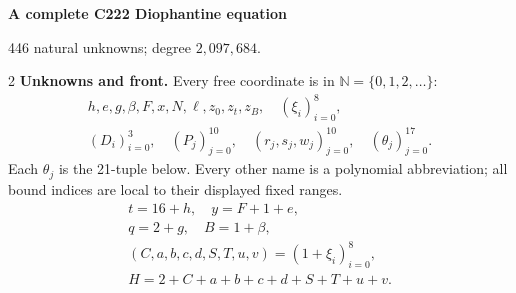 \documentclass[10pt,letterpaper]{article}
\newcommand{\NN}{\mathbb N}
\begin{document}
\fontsize{9}{10.2}\selectfont
\begin{center}
{\fontsize{11}{12}\selectfont\bfseries A complete C222 Diophantine equation}\par
446 natural unknowns; degree $2{,}097{,}684$.
\end{center}
\vspace{-4pt}
\begin{multicols}{2}
\textbf{Unknowns and front.} Every free coordinate is in
$\NN=\{0,1,2,\ldots\}$:
\[
\begin{gathered}
h,e,g,\beta,F,x,N,\ell,z_0,z_t,z_B,\quad(\xi_i)_{i=0}^8,\\
(D_i)_{i=0}^3,\quad(P_j)_{j=0}^{10},\quad
(r_j,s_j,w_j)_{j=0}^{10},\quad(\theta_j)_{j=0}^{17}.
\end{gathered}
\]
Each $\theta_j$ is the 21-tuple below. Every other name is a polynomial
abbreviation; all bound indices are local to their displayed fixed ranges.
\[
\begin{gathered}
t=16+h,\quad y=F+1+e,\\
q=2+g,\quad B=1+\beta,\\
(C,a,b,c,d,S,T,u,v)=(1+\xi_i)_{i=0}^8,\\
H=2+C+a+b+c+d+S+T+u+v.
\end{gathered}
\]


\end{multicols}
\end{document}
